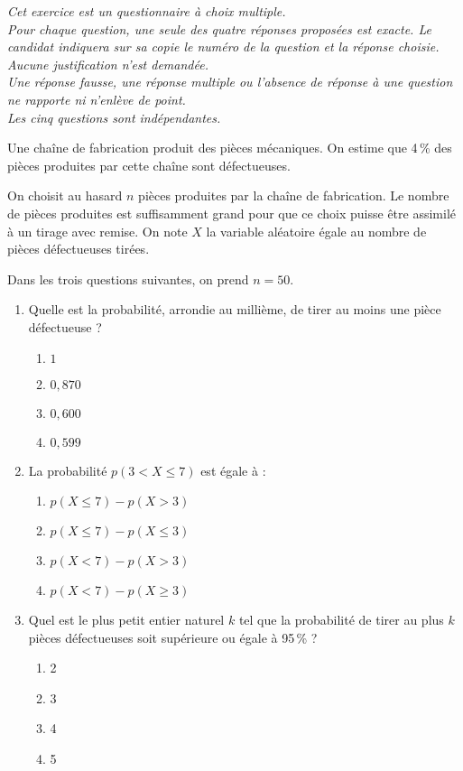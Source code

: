 \emph{Cet exercice est un questionnaire à choix multiple.\\ Pour chaque question, une seule des quatre réponses proposées est exacte. Le candidat indiquera sur sa copie le numéro de la question et la réponse choisie. Aucune justification n'est demandée.\\ Une réponse fausse, une réponse multiple ou l'absence de réponse à une question ne rapporte ni n'enlève de point.\\ Les cinq questions sont indépendantes.}

\bigskip

Une chaîne de fabrication produit des pièces mécaniques. On estime que 4\,\% des pièces produites par cette chaîne sont défectueuses.

\smallskip

On choisit au hasard $n$ pièces produites par la chaîne de fabrication. Le nombre de pièces produites est suffisamment grand pour que ce choix puisse être assimilé à un tirage avec remise. On note $X$ la variable aléatoire égale au nombre de pièces défectueuses tirées.

\medskip

Dans les trois questions suivantes, on prend $n = 50$.

\begin{enumerate}
	\item Quelle est la probabilité, arrondie au millième, de tirer au moins une pièce défectueuse ?
	\begin{enumerate}
		\item $1$
		\item $0,870$
		\item $0,600$
		\item $0,599$
	\end{enumerate}
	\pagebreak
	\item La probabilité $p(3 < X \leqslant 7)$ est égale à :
	\begin{enumerate}
		\item $p(X \leqslant 7) - p(X > 3)$
		\item $p(X \leqslant 7) - p(X \leqslant 3)$
		\item $p(X < 7) - p(X > 3)$
		\item $p(X < 7) - p(X \geqslant 3)$
	\end{enumerate}
	\item Quel est le plus petit entier naturel $k$ tel que la probabilité de tirer au plus $k$ pièces défectueuses soit supérieure ou égale à 95\,\% ?
	\begin{enumerate}
		\item 2
		\item 3
		\item 4
		\item 5
	\end{enumerate}
\end{enumerate}

